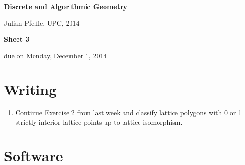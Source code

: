 \documentclass[11pt]{amsart}
\begin{document}
\begin{center}
\textbf{\sffamily
   Discrete and Algorithmic Geometry }

\medskip
   Julian Pfeifle,
   UPC, 2014 \mbox{}
\end{center}

\bigskip

\begin{center}
  \textbf{\sffamily Sheet 3}

\bigskip
 due on Monday, December 1, 2014

\end{center}

\bigskip
\bigskip
\bigskip

\section*{Writing}

\begin{enumerate}
\setlength{\itemsep}{2ex}
\item Continue Exercise 2 from last week and classify lattice polygons with 0 or 1 strictly interior lattice points up to lattice isomorphism.
\end{enumerate}

\bigskip
\bigskip
\section*{Software}
\end{document}
